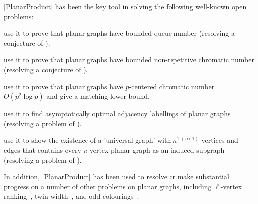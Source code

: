 \documentclass{patmorin}
\theoremstyle{plain}
\theoremstyle{definition}
\begin{document}
\noindent\cref{PlanarProduct} has been the key tool in solving the following well-known open problems:
\begin{compactitem}
\item \citet{DJMMUW20} use it to prove that planar graphs have bounded queue-number (resolving a conjecture of \citet{HLR92}).
\item  \citet{dujmovic.esperet.ea:planar} use it to prove that planar graphs have bounded non-repetitive chromatic number (resolving a conjecture of \citet{AGHR-RSA02}).
\item \citet{DFMS21} use it to prove that planar graphs have $p$-centered chromatic number $O(p^2\log p)$ and give a matching lower bound.
\item \citet{DEJGMM21} use it to find asymptotically optimal adjacency labellings of planar graphs (resolving a problem of \citet{kannan.naor.ea:implicit}).
\item \citet{EJM} use it to show the existence of a 'universal graph' with $n^{1+o(1)}$ vertices and edges that contains every $n$-vertex planar graph as an induced subgraph (resolving a problem of \citet{babai.chung.ea:on}).
\end{compactitem}
In addition, \cref{PlanarProduct} has been used to resolve or make substantial progress on a number of other problems on planar graphs, including $\ell$-vertex ranking~\citep{BDJM}, twin-width~\citep{BKW}, and odd colourings~\citep{DMO}.

\end{document}
